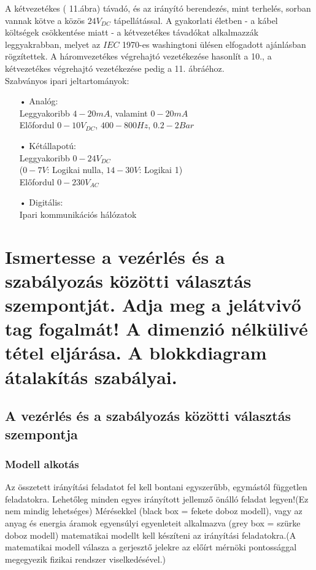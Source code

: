 \documentclass[11pt,a4paper]{article}
\begin{document}
A kétvezetékes ( 11.ábra) távadó, és az irányító berendezés, mint terhelés, sorban vannak kötve a közös $24 V_{DC}$ tápellátással.
A gyakorlati életben - a kábel költségek csökkentése miatt - a kétvezetékes távadókat alkalmazzák leggyakrabban, melyet az $IEC$ 1970-es
washingtoni ülésen elfogadott ajánlásban rögzítettek.
A háromvezetékes végrehajtó vezetékezése hasonlít a 10., a kétvezetékes végrehajtó vezetékezése pedig a 11. ábráéhoz.
$$$$
Szabványos ipari jeltartományok:
\begin{enumerate}
	\item[•]Analóg:\\
	Leggyakoribb $4-20 mA$, valamint $0-20 mA$\\
	Előfordul $0-10 V_{DC}$, $400-800 Hz$, $0.2-2 Bar$
	\item[•]Kétállapotú:\\
	Leggyakoribb $0-24 V_{DC}$\\
	($0-7 V$: Logikai nulla, $14-30 V$: Logikai 1)\\		Előfordul $0-230 V_{AC}$
	\item[•]Digitális:\\Ipari kommunikációs hálózatok
\end{enumerate}

\section{Ismertesse a vezérlés és a szabályozás közötti választás szempontját. Adja meg a jelátvivő tag fogalmát! A dimenzió nélkülivé tétel eljárása. A blokkdiagram átalakítás szabályai.}
\subsection{A vezérlés és a szabályozás közötti választás szempontja}
\subsubsection{Modell alkotás}
Az összetett irányítási feladatot fel kell bontani egyszerűbb, egymástól független feladatokra. Lehetőleg minden egyes irányított jellemző önálló feladat legyen!(Ez nem mindig lehetséges)
Mérésekkel (black box = fekete doboz modell), vagy az anyag és energia áramok egyensúlyi egyenleteit alkalmazva (grey box = szürke doboz modell) matematikai modellt kell készíteni az irányítási feladatokra.(A matematikai modell válasza a gerjesztő jelekre az előírt mérnöki pontossággal megegyezik fizikai rendszer viselkedésével.)
\end{document}
